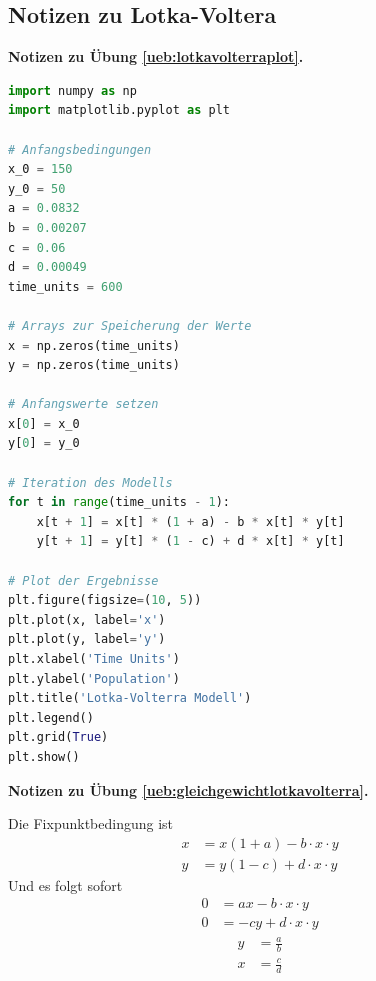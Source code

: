 \documentclass[%
11pt,%
twoside,%
titlepage,%
german,%
headsepline%
]{scrartcl}
\newcommand{\concatueb}[1]{ueb:#1}%
\newcommand{\concatlsg}[1]{lsg:#1}%
\newenvironment{lsg}[1]{%
    \par\noindent\textbf{Notizen zu Übung \ref{\concatueb{#1}}.}%
    \label{\concatlsg{#1}}
}{%
    \par%
}
\begin{document}
\clearpage

\subsection{Notizen zu Lotka-Voltera}

\begin{lsg}{lotkavolterraplot}
    \begin{lstlisting}[language=python]
import numpy as np
import matplotlib.pyplot as plt

# Anfangsbedingungen
x_0 = 150
y_0 = 50
a = 0.0832
b = 0.00207
c = 0.06
d = 0.00049
time_units = 600

# Arrays zur Speicherung der Werte
x = np.zeros(time_units)
y = np.zeros(time_units)

# Anfangswerte setzen
x[0] = x_0
y[0] = y_0

# Iteration des Modells
for t in range(time_units - 1):
    x[t + 1] = x[t] * (1 + a) - b * x[t] * y[t]
    y[t + 1] = y[t] * (1 - c) + d * x[t] * y[t]

# Plot der Ergebnisse
plt.figure(figsize=(10, 5))
plt.plot(x, label='x')
plt.plot(y, label='y')
plt.xlabel('Time Units')
plt.ylabel('Population')
plt.title('Lotka-Volterra Modell')
plt.legend()
plt.grid(True)
plt.show()

    \end{lstlisting}
\end{lsg}

\begin{lsg}{gleichgewichtlotkavolterra}
Die Fixpunktbedingung ist
\begin{align*}
x &= x(1+a)-b\cdot x\cdot y\\
y &= y(1-c)+d\cdot x\cdot y
\end{align*}
Und es folgt sofort
\begin{align*}
0 &= ax-b\cdot x\cdot y\\
0 &= -cy+d\cdot x\cdot y
\end{align*}
\begin{align*}
y &= \frac{a}{b}\\
x &= \frac{c}{d}
\end{align*}
\end{lsg}

\clearpage



\end{document}
